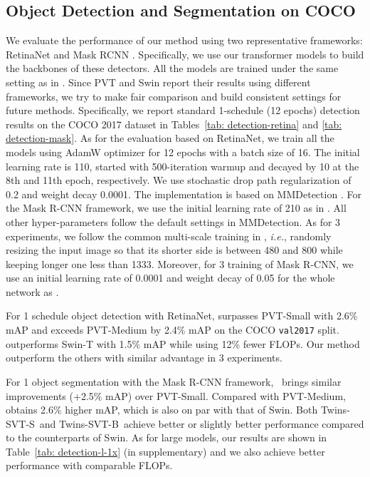 \documentclass{article}
\def \ie {\textit{i.e.}\xspace}
\def \altsmall   {Twins-SVT-S}
\def \altbase   {Twins-SVT-B}
\def \pcpvtsmall {Twins-PCPVT-S}
\def \pcpvtbase {Twins-PCPVT-B}
\begin{document}
\subsection{Object Detection and Segmentation on COCO}
We evaluate the performance of our method using two representative frameworks: RetinaNet \cite{lin2017focal} and Mask RCNN \cite{he2017mask}. Specifically, we use our transformer models to build the backbones of these detectors. All the models are trained under the same setting as  in \cite{wang2021pyramid}. Since PVT and Swin report their results using different frameworks, we try to make fair comparison and build consistent settings for future methods. Specifically, we report standard 1-schedule (12 epochs) detection results on the COCO 2017 dataset \cite{lin2014microsoft} in Tables~\ref{tab: detection-retina} and \ref{tab: detection-mask}. As for the evaluation based on RetinaNet, we train all the models using  AdamW \cite{loshchilov2018decoupled} optimizer for 12 epochs with a batch size of 16. The initial learning rate is 110, started with 500-iteration warmup and decayed by 10 at the 8th and 11th epoch, respectively. We use stochastic drop path regularization of 0.2 and weight decay 0.0001.  The implementation is based on MMDetection \cite{mmdetection}. For the Mask R-CNN framework,  we use the initial learning rate of 210 as in \cite{wang2021pyramid}. All other hyper-parameters follow the default settings in MMDetection. As for 3 experiments, we follow the common multi-scale training  in \cite{carion2020end,liu2021swin}, \ie, randomly resizing the input image so that its shorter side is between 480 and 800 while keeping longer one less than 1333. Moreover, for 3 training of Mask R-CNN, we use an initial learning rate of 0.0001 and weight decay of 0.05 for the whole network as \cite{liu2021swin}.

For 1 schedule object detection with RetinaNet,  surpasses PVT-Small with 2.6\%  mAP and \text{\pcpvtbase} exceeds PVT-Medium by 2.4\%  mAP on the COCO \texttt{val2017} split. \text{\altsmall} outperforms Swin-T with 1.5\%  mAP while using 12\% fewer FLOPs. Our method outperform the others with similar advantage in 3 experiments. 

For  1 object segmentation with the Mask R-CNN framework, \text{\pcpvtsmall}\ brings similar improvements (+2.5\% mAP) over PVT-Small.  Compared with PVT-Medium, \text{\pcpvtbase} obtains 2.6\%  higher mAP, which is also on par with that of Swin. Both \altsmall\ and \altbase\ achieve better or slightly better performance compared to  the counterparts of Swin.
As for large models, our results are shown in Table~\ref{tab: detection-l-1x} (in supplementary) and we also achieve better performance with comparable FLOPs.
\end{document}
